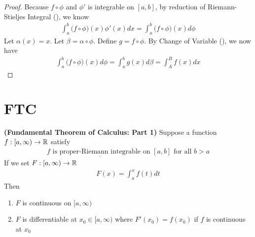 \documentclass{report}
\begin{document}
\begin{proof}
Because $f\circ \phi$ and  $\phi'$ is integrable on $[a,b]$, by reduction of Riemann-Stieljes Integral (), we know 
\begin{align*}
\int_a^b \big(f\circ \phi)(x)  \phi'(x)dx= \int_a^b \big(f\circ \phi \big)(x)d \phi
\end{align*}
Let $\alpha (x)=x$. Let $\beta = \alpha \circ  \phi$. Define $g=f \circ  \phi $. By Change of Variable (), we now have  
\begin{align*}
\int_a^b \big(f \circ  \phi \big)(x)d \phi =\int_a^b g(x)d\beta = \int_A^B f(x)dx
\end{align*}
\end{proof}
\section{FTC}
\begin{theorem}
  \label{FTC1}
\textbf{(Fundamental Theorem of Calculus: Part 1)} Suppose a function $f:[a,\infty )\rightarrow \mathbb{R}$ satisfy
\begin{align*}
f\text{ is $\underline{\text{proper-Riemann integrable}}$ on $[a,b]$  for all $b>a$}
\end{align*}
If we set $F:[a,\infty) \to \mathbb{R}$ 
\begin{align*}
F(x)=\int_a^x f(t)dt
\end{align*}
Then 
\begin{enumerate}[label=(\alph*)]
  \item $F$ is continuous on $[a,\infty )$
  \item $F$ is differentiable at  $x_0 \in [a,\infty )$  where $F'(x_0)=f(x_0)$ if $f$ is continuous at $x_0$
\end{enumerate}
\end{theorem}
\end{document}
